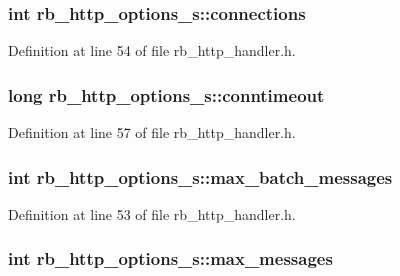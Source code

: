 \subsubsection[{connections}]{\setlength{\rightskip}{0pt plus 5cm}int rb\+\_\+http\+\_\+options\+\_\+s\+::connections}\label{structrb__http__options__s_a2538df47ad13074f7f3f2dc08896fd64}


Definition at line 54 of file rb\+\_\+http\+\_\+handler.\+h.

\hypertarget{structrb__http__options__s_a8e300262e7726f2d0d4c52b3eaacce57}{}
\subsubsection[{conntimeout}]{\setlength{\rightskip}{0pt plus 5cm}long rb\+\_\+http\+\_\+options\+\_\+s\+::conntimeout}\label{structrb__http__options__s_a8e300262e7726f2d0d4c52b3eaacce57}


Definition at line 57 of file rb\+\_\+http\+\_\+handler.\+h.

\hypertarget{structrb__http__options__s_ac536073f205a9b3da3b8e4996147ad12}{}
\subsubsection[{max\+\_\+batch\+\_\+messages}]{\setlength{\rightskip}{0pt plus 5cm}int rb\+\_\+http\+\_\+options\+\_\+s\+::max\+\_\+batch\+\_\+messages}\label{structrb__http__options__s_ac536073f205a9b3da3b8e4996147ad12}


Definition at line 53 of file rb\+\_\+http\+\_\+handler.\+h.

\hypertarget{structrb__http__options__s_ac5ccee77d6e77acc3955c6f24208b418}{}
\subsubsection[{max\+\_\+messages}]{\setlength{\rightskip}{0pt plus 5cm}int rb\+\_\+http\+\_\+options\+\_\+s\+::max\+\_\+messages}\label{structrb__http__options__s_ac5ccee77d6e77acc3955c6f24208b418}


